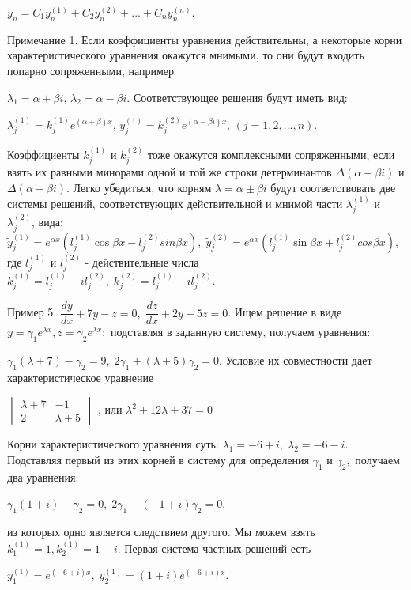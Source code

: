 \documentclass[11pt,a5paper,top=10mm]{book}
\begin{document}
	\par
	\hspace{20mm}
	$y_n=C_1y_n^{(1)}+C_2y_n^{(2)}+...+C_ny_n^{(n)}.$
	\par
	Примечание 1. Если коэффициенты уравнения действительны, а некоторые корни характеристического уравнения окажутся мнимыми, то они будут входить попарно сопряженными, например
	\par
	\hspace{25mm}
	$\lambda_1=\alpha+\beta i$,     $\lambda_2=\alpha-\beta i.$
	\newline
	Соответствующее решения будут иметь вид:
	\par
	\hspace{10mm}
	$\lambda_j^{(1)}=k_j^{(1)}e^{(\alpha+\beta)x}$, $y_j^{(1)}=k_j^{(2)}e^{(\alpha-\beta i)x}$,
	$(j=1, 2,..., n)$.
	\par
	Коэффициенты $k_j^{(1)}$ и $k_j^{(2)}$ тоже окажутся комплексными сопряженными, если взять их равными минорами одной и той же строки детерминантов $\Delta(\alpha+\beta i)$ и $\Delta(\alpha-\beta i)$. Легко убедиться, что корням $\lambda=\alpha \pm \beta i$ будут соответствовать две системы решений, соответствующих действительной и мнимой части $\lambda_j^{(1)}$ и $\lambda_j^{(2)}$, вида: 
	\newline
	$\widetilde{y}_j^{(1)}=e^{\alpha x} (l_j^{(1)} \cos{\beta x} - l_j^{(2)} sin{\beta x} ),\;
	 \widetilde{y}_j^{(2)}=e^{\alpha x} (l_j^{(1)} \sin{\beta x} + l_j^{(2)} cos{\beta x} ),\;$где $l_j^{(1)}$ и $l_j^{(2)}$ - действительные числа $k_j^{(1)}=l_j^{(1)}+il_j^{(2)},\; k_j^{(2)}=l_j^{(1)}-il_j^{(2)}.$
	 \par
	 Пример 5. $\dfrac{dy}{dx}+7y-z=0, \; \dfrac{dz}{dx}+2y+5z=0$. Ищем решение в виде $y=\gamma_1 e^{\lambda x}, z=\gamma_2e^{\lambda x};$ подставляя в заданную систему, получаем уравнения:
	 \par 
	 \hspace{10mm}
	 $\gamma_1 (\lambda + 7) - \gamma_2 = 9,\; 2\gamma_1+(\lambda+5)\gamma_2=0.$
	 \newline 
	 Условие их совместности дает характеристическое уравнение
	 \par 
	 $\begin{vmatrix}
		 \lambda+7& -1\\
		 2& \lambda+5
	 \end{vmatrix}$
	 , или $\lambda^2+12\lambda+37=0$
	 \par
	 Корни характеристического уравнения суть: $\lambda_1=-6+i, \; \lambda_2=-6-i.$
	 Подставляя первый из этих корней в систему для определения $\gamma_1$ и $\gamma_2,$ получаем два уравнения:
	 \par
	 $\gamma_1(1+i)-\gamma_2=0, \; 2\gamma_1+(-1+i)\gamma_2=0$,
	 \par из которых одно является следствием другого. Мы можем взять $k_1^{(1)}=1, k_2^{(1)}=1+i$. Первая система частных решений есть 
	 \par 
	 $y_1^{(1)}=e^{(-6+i)x}, \; y_2^{(1)}=(1+i)e^{(-6+i)x}$.
	 
\end{document}
